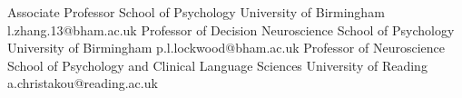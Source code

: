 \noindent
{}
	{Associate Professor}
	{School of Psychology}
	{University of Birmingham}
	{l.zhang.13@bham.ac.uk}%
	{Professor of Decision Neuroscience}
	{School of Psychology}
	{University of Birmingham}
	{p.l.lockwood@bham.ac.uk}%
	{Professor of Neuroscience}
	{School of Psychology and Clinical Language Sciences}
	{University of Reading}
	{a.christakou@reading.ac.uk}
